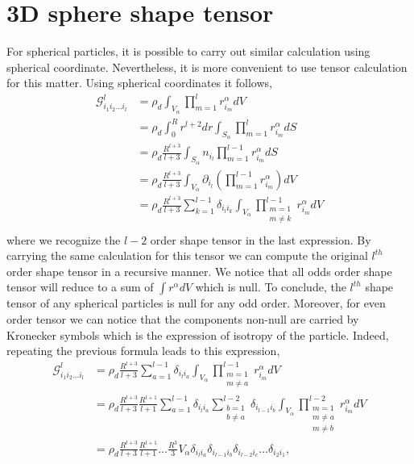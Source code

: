 \section{3D sphere shape tensor}
For spherical particles, it is possible to carry out similar calculation using spherical coordinate. 
Nevertheless, it is more convenient to use tensor calculation for this matter. 
Using spherical coordinates it follows,
\begin{align*}
    \mathcal{G}_{i_1i_2\ldots i_l}^l 
    &= \rho_d \int_{V_\alpha} \prod^l_{m=1}r^\alpha_{i_m} dV\\
    &= \rho_d \int_0^R r^{l+2} dr  
      \int_{S_\alpha} \prod^l_{m=1}r^\alpha_{i_m} dS\\
    &=\rho_d \frac{R^{l+3}}{l+3}
      \int_{S_\alpha}  n_{i_l} \prod^{l-1}_{m=1} r^\alpha_{i_m} dS\\
    &=\rho_d \frac{R^{l+3}}{l+3}
      \int_{V_\alpha}  \partial_{i_l} \left(\prod^{l-1}_{m=1} r^\alpha_{i_m}\right) dV\\
    &=\rho_d \frac{R^{l+3}}{l+3}\sum_{k=1}^{l-1} \delta_{i_l i_k}
      \int_{V_\alpha}  \prod^{l-1}_{\substack{m=1\\ m\neq k}} r^\alpha_{i_m} dV\\
\end{align*}
where we recognize the $l-2$ order shape tensor in the last expression. 
By carrying the same calculation for this tensor we can compute the original $l^{th}$ order shape tensor in a recursive manner. 
We notice that all odds order shape tensor will reduce to a sum of $\int r^\alpha dV$ which is null. 
To conclude, the  $l^{th}$ shape tensor of any spherical particles is null for any odd order. 
Moreover, for even order tensor we can notice that the components non-null are carried by Kronecker symbols which is the expression of isotropy of the particle. 
Indeed, repeating the previous formula leads to this expression,
\begin{align*}
    \mathcal{G}_{i_1i_2\ldots i_l}^l 
    &=\rho_d \frac{R^{l+3}}{l+3}\sum_{a=1}^{l-1} \delta_{i_l i_a}
      \int_{V_\alpha}  \prod^{l-1}_{\substack{m=1\\ m\neq a}} r^\alpha_{i_m} dV\\
    &=\rho_d \frac{R^{l+3}}{l+3}
    \frac{R^{l+1}}{l+1}\sum_{a=1}^{l-1} \delta_{i_l i_a}
    \sum_{\substack{b=1\\ b\neq a}}^{l-2} \delta_{i_{l-1} i_b}
      \int_{V_\alpha}  \prod^{l-2}_{\substack{m=1\\ m\neq a\\ m\neq b}} r^\alpha_{i_m} dV\\
    &=\rho_d \frac{R^{l+3}}{l+3}
    \frac{R^{l+1}}{l+1} 
    \ldots
    \frac{R^3}{3}
    V_\alpha
    \delta_{i_l i_a}
    \delta_{i_{l-1} i_b}
    \delta_{i_{l-2} i_c}
    \ldots
    \delta_{i_2i_1},
\end{align*}
